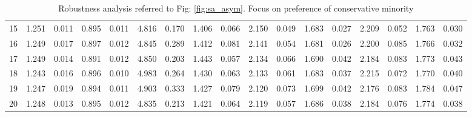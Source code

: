 \documentclass{article}
\begin{document}
\begin{table}[H]
{\begin{tabular}{|c|c|c|c|c|c|c|c|c|c|c|c|c|c|c|c|c|}
    15 & 1.251 & 0.011 & 0.895 & 0.011 & 4.816 & 0.170 & 1.406 & 0.066 & 2.150 & 0.049 & 1.683 & 0.027 & 2.209 & 0.052 & 1.763 & 0.030 \\ 
    16 & 1.249 & 0.017 & 0.897 & 0.012 & 4.845 & 0.289 & 1.412 & 0.081 & 2.141 & 0.054 & 1.681 & 0.026 & 2.200 & 0.085 & 1.766 & 0.032 \\ 
    17 & 1.249 & 0.014 & 0.891 & 0.012 & 4.850 & 0.203 & 1.443 & 0.057 & 2.134 & 0.066 & 1.690 & 0.042 & 2.184 & 0.083 & 1.773 & 0.043 \\ 
    18 & 1.243 & 0.016 & 0.896 & 0.010 & 4.983 & 0.264 & 1.430 & 0.063 & 2.133 & 0.061 & 1.683 & 0.037 & 2.215 & 0.072 & 1.770 & 0.040 \\ 
    19 & 1.247 & 0.019 & 0.894 & 0.011 & 4.903 & 0.333 & 1.427 & 0.079 & 2.120 & 0.073 & 1.699 & 0.042 & 2.176 & 0.083 & 1.784 & 0.047 \\ 
    20 & 1.248 & 0.013 & 0.895 & 0.012 & 4.835 & 0.213 & 1.421 & 0.064 & 2.119 & 0.057 & 1.686 & 0.038 & 2.184 & 0.076 & 1.774 & 0.038 \\ 
   \hline
\end{tabular}
}

\caption{Robustness analysis referred to Fig: \ref{fig:sa_asym}. Focus on preference of conservative minority}
\label{tab:sa_asym_etcnmn}
\end{table}
\end{document}
